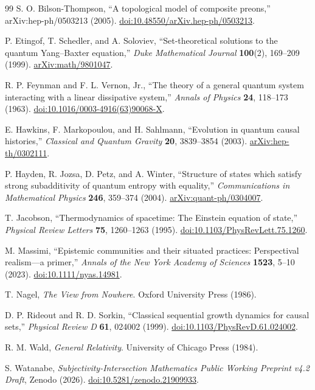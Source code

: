 \documentclass[11pt]{article}
\theoremstyle{definition}
\theoremstyle{remark}
\begin{document}
\begin{thebibliography}{99}
S. O. Bilson-Thompson, ``A topological model of composite preons,'' arXiv:hep-ph/0503213 (2005). \href{https://doi.org/10.48550/arXiv.hep-ph/0503213}{doi:10.48550/arXiv.hep-ph/0503213}.

P. Etingof, T. Schedler, and A. Soloviev, ``Set-theoretical solutions to the quantum Yang--Baxter equation,'' \emph{Duke Mathematical Journal} \textbf{100}(2), 169--209 (1999). \href{https://arxiv.org/abs/math/9801047}{arXiv:math/9801047}.

R. P. Feynman and F. L. Vernon, Jr., ``The theory of a general quantum system interacting with a linear dissipative system,'' \emph{Annals of Physics} \textbf{24}, 118--173 (1963). \href{https://doi.org/10.1016/0003-4916(63)90068-X}{doi:10.1016/0003-4916(63)90068-X}.

E. Hawkins, F. Markopoulou, and H. Sahlmann, ``Evolution in quantum causal histories,'' \emph{Classical and Quantum Gravity} \textbf{20}, 3839--3854 (2003). \href{https://arxiv.org/abs/hep-th/0302111}{arXiv:hep-th/0302111}.

P. Hayden, R. Jozsa, D. Petz, and A. Winter, ``Structure of states which satisfy strong subadditivity of quantum entropy with equality,'' \emph{Communications in Mathematical Physics} \textbf{246}, 359--374 (2004). \href{https://arxiv.org/abs/quant-ph/0304007}{arXiv:quant-ph/0304007}.

T. Jacobson, ``Thermodynamics of spacetime: The Einstein equation of state,'' \emph{Physical Review Letters} \textbf{75}, 1260--1263 (1995). \href{https://doi.org/10.1103/PhysRevLett.75.1260}{doi:10.1103/PhysRevLett.75.1260}.

M. Massimi, ``Epistemic communities and their situated practices: Perspectival realism---a primer,'' \emph{Annals of the New York Academy of Sciences} \textbf{1523}, 5--10 (2023). \href{https://doi.org/10.1111/nyas.14981}{doi:10.1111/nyas.14981}.

T. Nagel, \emph{The View from Nowhere}. Oxford University Press (1986).

D. P. Rideout and R. D. Sorkin, ``Classical sequential growth dynamics for causal sets,'' \emph{Physical Review D} \textbf{61}, 024002 (1999). \href{https://doi.org/10.1103/PhysRevD.61.024002}{doi:10.1103/PhysRevD.61.024002}.

R. M. Wald, \emph{General Relativity}. University of Chicago Press (1984).

S. Watanabe, \emph{Subjectivity-Intersection Mathematics Public Working Preprint v4.2 Draft}, Zenodo (2026). \href{https://doi.org/10.5281/zenodo.21909933}{doi:10.5281/zenodo.21909933}.

\end{thebibliography}
\end{document}
